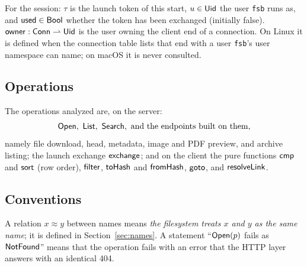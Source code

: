 For the session: $\tau$ is the launch token of this start, $u\in\mathsf{Uid}$ the user
\texttt{fsb} runs as, and $\mathsf{used}\in\mathsf{Bool}$ whether the token has been exchanged
(initially false).  $\mathsf{owner}:\mathsf{Conn}\rightharpoonup\mathsf{Uid}$ is the user owning the
client end of a connection.  On Linux it is defined when the connection table
lists that end with a user \texttt{fsb}'s user namespace can name; on macOS it is
never consulted.

\subsection{Operations}

The operations analyzed are, on the server:
\[
  \mathsf{Open},\ \mathsf{List},\ \mathsf{Search},\ \text{and the endpoints built on them,}
\]
namely file download, head, metadata, image and PDF preview, and archive
listing; the launch exchange $\mathsf{exchange}$; and on the client the pure functions $\mathsf{cmp}$ and $\mathsf{sort}$ (row order),
$\mathsf{filter}$, $\mathsf{toHash}$ and $\mathsf{fromHash}$, $\mathsf{goto}$, and $\mathsf{resolveLink}$.

\subsection{Conventions}

A relation $x\approx y$ between names means \emph{the filesystem treats $x$ and
$y$ as the same name}; it is defined in Section~\ref{sec:names}.  A statement
``$\mathsf{Open}(p)$ fails as $\mathsf{NotFound}$'' means that the operation fails with an error
that the HTTP layer answers with an identical 404.
